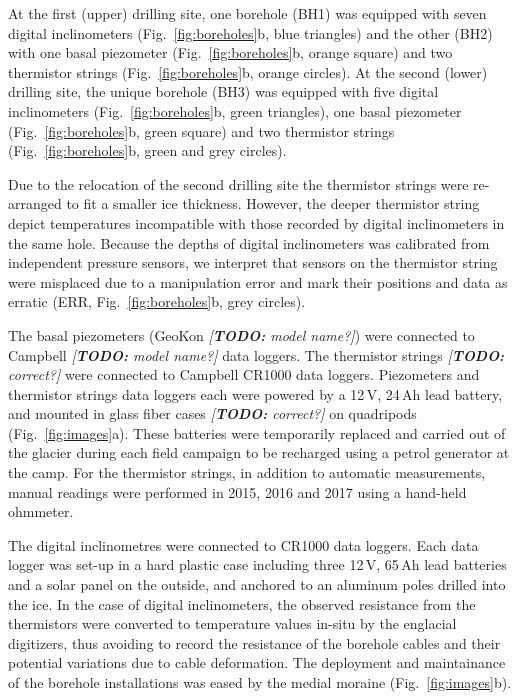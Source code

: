 \documentclass[utf8]{article}
\newcommand{\todo}[1]{\textcolor{c3}{\emph{[\textbf{TODO:} #1]}}}
\begin{document}
    At the first (upper) drilling site, one borehole (BH1) was equipped with
    seven digital inclinometers (Fig.~\ref{fig:boreholes}b, blue triangles) and
    the other (BH2) with one basal piezometer (Fig.~\ref{fig:boreholes}b,
    orange square) and two thermistor strings (Fig.~\ref{fig:boreholes}b,
    orange circles). At the second (lower) drilling site, the unique
    borehole (BH3) was equipped with five digital inclinometers
    (Fig.~\ref{fig:boreholes}b, green triangles), one basal piezometer
    (Fig.~\ref{fig:boreholes}b, green square) and two thermistor strings
    (Fig.~\ref{fig:boreholes}b, green and grey circles).

    Due to the relocation of the second drilling site the thermistor strings
    were re-arranged to fit a smaller ice thickness. However, the deeper
    thermistor string depict temperatures incompatible with those recorded by
    digital inclinometers in the same hole. Because the depths of digital
    inclinometers was calibrated from independent pressure sensors, we
    interpret that sensors on the thermistor string were misplaced due to a
    manipulation error and mark their positions and data as erratic (ERR,
    Fig.~\ref{fig:boreholes}b, grey circles).

    The basal piezometers (GeoKon \todo{model name?}) were connected to
    Campbell \todo{model name?} data loggers. The thermistor strings
    \citep[NTC~Fenwal 135-103FAG-J01,][]{Ryser.2014} \todo{correct?} were
    connected to Campbell CR1000 data loggers. Piezometers and thermistor
    strings data loggers each were powered by a 12\,V, 24\,Ah lead battery, and
    mounted in glass fiber cases \todo{correct?} on quadripods
    (Fig.~\ref{fig:images}a). These batteries were temporarily replaced and
    carried out of the glacier during each field campaign to be recharged using
    a petrol generator at the camp. For the thermistor strings, in addition to
    automatic measurements, manual readings were performed in 2015, 2016 and
    2017 using a hand-held ohmmeter.

    The digital inclinometres \citep[DIBOSS,][]{Ryser.2014, Ryser.etal.2014,
    Ryser.etal.2014a} were connected to CR1000 data loggers. Each data logger
    was set-up in a hard plastic case including three 12\,V, 65\,Ah lead
    batteries and a solar panel on the outside, and anchored to an aluminum
    poles drilled into the ice.
    In the case of digital inclinometers, the observed resistance from the
    thermistors were converted to temperature values in-situ by the englacial
    digitizers, thus avoiding to record the resistance of the borehole cables
    and their potential variations due to cable deformation. The deployment and
    maintainance of the borehole installations was eased by the medial moraine
    (Fig.~\ref{fig:images}b).
\end{document}
